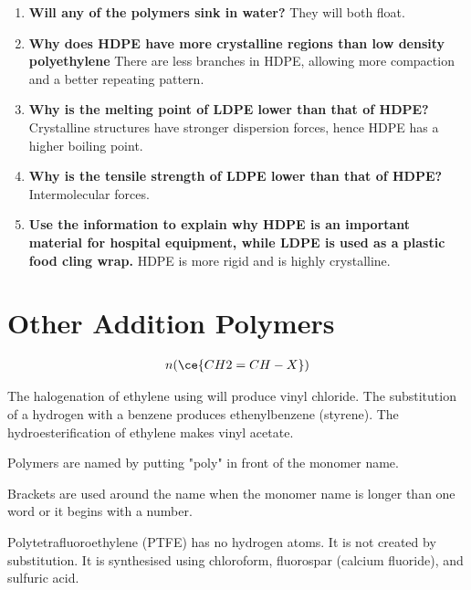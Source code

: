 	\begin{enumerate}
		\item \textbf{Will any of the polymers sink in water?}
			\subitem They will both float.

		\item \textbf{Why does HDPE have more crystalline regions than low density polyethylene}
			\subitem There are less branches in HDPE, allowing more compaction and a better repeating pattern.
			
		\item \textbf{Why is the melting point of LDPE lower than that of HDPE?}
			\subitem Crystalline structures have stronger dispersion forces, hence HDPE has a higher boiling point.

		\item \textbf{Why is the tensile strength of LDPE lower than that of HDPE?}
			\subitem Intermolecular forces.

		\item \textbf{Use the information to explain why HDPE is an important material for hospital equipment, while LDPE is used as a plastic food cling wrap.}
			\subitem HDPE is more rigid and is highly crystalline.
	\end{enumerate}

\section{Other Addition Polymers}

	\begin{align*}
		n(\ce{CH2 = CH - X})
	\end{align*}

	\begin{center}
	\end{center}

	The halogenation of ethylene using  will produce vinyl chloride. The substitution of a hydrogen with a benzene produces ethenylbenzene (styrene). The hydroesterification of ethylene makes vinyl acetate.

	Polymers are named by putting "poly" in front of the monomer name.

	Brackets are used around the name when the monomer name is longer than one word or it begins with a number.

	Polytetrafluoroethylene (PTFE) has no hydrogen atoms. It is not created by substitution. It is synthesised using chloroform, fluorospar (calcium fluoride), and sulfuric acid.

